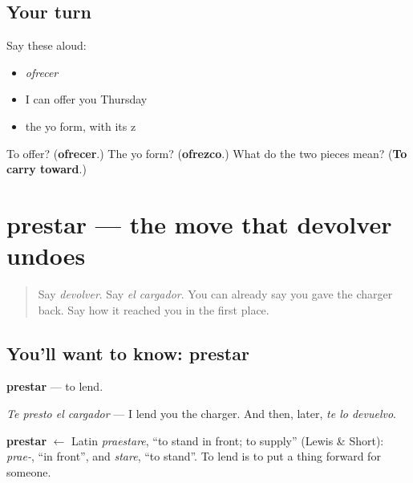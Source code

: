 \subsection*{Your turn}
Say these aloud:

\begin{itemize}
\raggedright
  \item \emph{ofrecer}
  \item I can offer you Thursday
  \item the yo form, with its z
\end{itemize}

\begin{tcolorbox}[breakable,colback=teal!4,colframe=teal!35!black,title={Before you move on}]
To offer? (\textbf{ofrecer}.) The yo form? (\textbf{ofrezco}.) What do the two pieces mean? (\textbf{To carry toward}.)
\end{tcolorbox}
\section[prestar]{prestar — the move that devolver undoes}

\label{lesson:ES-C436-prestar}



\begin{quote}
Say \emph{devolver}. Say \emph{el cargador}. You can already say you gave the charger back. Say how it reached you in the first place.
\end{quote}

\subsection*{You'll want to know: prestar}
\textbf{prestar} — to lend.

\emph{Te presto el cargador} — I lend you the charger. And then, later, \emph{te lo devuelvo}.

\begin{cousinweb}
\textbf{prestar} $\leftarrow$ Latin \emph{praestare}, \textquotedblleft{}to stand in front; to supply\textquotedblright{} (Lewis \& Short): \emph{prae-}, \textquotedblleft{}in front\textquotedblright{}, and \emph{stare}, \textquotedblleft{}to stand\textquotedblright{}. To lend is to put a thing forward for someone.
\end{cousinweb}

